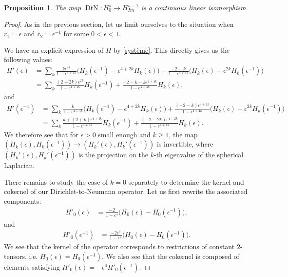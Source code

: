 \documentclass[12pt]{article}
\newtheorem{prop}[thm]{Proposition}
\begin{document}
    \begin{prop}\label{inverse DtN}
        The map $\operatorname{DtN}: H^s_{0}\to H^{s-1}_{Im}$ is a continuous linear isomorphism.
    \end{prop}
    \begin{proof}
        As in the previous section, let us limit ourselves to the situation when $r_1 = \epsilon$ and $r_2 = \epsilon^{-1}$ for some $0<\epsilon<1$.
        
        We have an explicit expression of $H$ by \eqref{système}. This directly gives us the following values:
        \begin{align*}
            H'(\epsilon) &=\sum_k\frac{k\epsilon^{2k}}{1-\epsilon^{4+4k}}\big(H_{k}(\epsilon^{-1}) -\epsilon^{4+2k}H_{k}(\epsilon) \big)+\frac{-2-k}{1-\epsilon^{4+4k}}\big(H_{k}(\epsilon) - \epsilon^{2k} H_{k}(\epsilon^{-1})\big)\\
            &=\sum_k\frac{(2+2k)\epsilon^{2k}}{1-\epsilon^{4+4k}}H_{k}(\epsilon^{-1})+\frac{-2-k-k\epsilon^{4+4k}}{1-\epsilon^{4+4k}}H_{k}(\epsilon).
        \end{align*}
        and
        \begin{align*}
            H'(\epsilon^{-1}) &=\sum_k\frac{k}{1-\epsilon^{4+4k}}\big(H_{k}(\epsilon^{-1}) -\epsilon^{4+2k}H_{k}(\epsilon) \big)+\frac{(-2-k)\epsilon^{4+2k}}{1-\epsilon^{4+4k}}\big(H_{k}(\epsilon) - \epsilon^{2k} H_{k}(\epsilon^{-1})\big)\\
            &=\sum_k\frac{k+(2+k)\epsilon^{4+4k}}{1-\epsilon^{4+4k}}H_{k}(\epsilon^{-1})+\frac{(-2-2k)\epsilon^{4+2k}}{1-\epsilon^{4+4k}}H_{k}(\epsilon).
        \end{align*}
        We therefore see that for $\epsilon>0$ small enough and $k\geqslant 1$, the map $(H_k(\epsilon),H_k(\epsilon^{-1}))\to (H_k'(\epsilon),H_k'(\epsilon^{-1}))$ is invertible, where $(H_k'(\epsilon),H_k'(\epsilon^{-1}))$ is the projection on the $k$-th eigenvalue of the spherical Laplacian.
        
        There remains to study the case of $k=0$ separately to determine the kernel and cokernel of our Dirichlet-to-Neumann operator. Let us first rewrite the associated components:
        \begin{align*}
            H'_0(\epsilon) &=\frac{-2}{1-\epsilon^{4}}\big(H_{0}(\epsilon) - H_{0}(\epsilon^{-1})\big),
        \end{align*}
        and
        \begin{align*}
            H'_0(\epsilon^{-1}) &=\frac{-2\epsilon^{4}}{1-\epsilon^{4}}\big(H_{0}(\epsilon) -  H_{0}(\epsilon^{-1})\big).
        \end{align*}
        We see that the kernel of the operator corresponds to restrictions of constant $2$-tensors, i.e. $H_0(\epsilon) = H_0(\epsilon^{-1})$. We also see that the cokernel is composed of elements satisfying $ H'_0(\epsilon)=-\epsilon^4H'_0(\epsilon^{-1})$.
    \end{proof}
    
\end{document}
